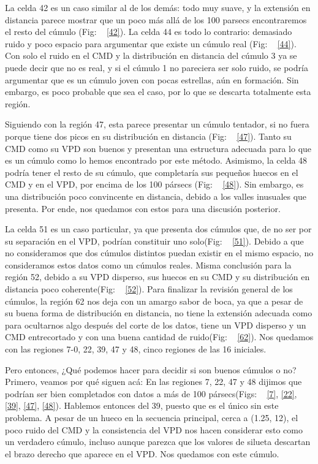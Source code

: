 \documentclass[10pt,twocolumn]{article}
\begin{document}
La celda 42 es un caso similar al de los demás: todo muy suave, y la extensión en distancia parece mostrar que un poco más allá de los 
100 parsecs encontraremos el resto del cúmulo (Fig: ~ \ref{42}). La celda 44 es todo lo contrario: demasiado ruido y poco espacio para argumentar que existe
un cúmulo real (Fig: ~ \ref{44}). Con solo el ruido en el CMD y la distribución en distancia del cúmulo 3 ya se puede decir que no es real, y si el cúmulo 1
no pareciera ser solo ruido, se podría argumentar que es un cúmulo joven con pocas estrellas, aún en formación. Sin embargo, es poco probable
que sea el caso, por lo que se descarta totalmente esta región. 

Siguiendo con la región 47, esta parece presentar un cúmulo tentador, si no fuera porque tiene dos picos en su distribución en distancia (Fig: ~ \ref{47}). 
Tanto su CMD como su VPD son buenos y presentan una estructura adecuada para lo que es un cúmulo como lo hemos encontrado por este método. 
Asimismo, la celda 48 podría tener el resto de su cúmulo, que completaría sus pequeños huecos en el CMD y en el VPD, por encima de los 
100 pársecs (Fig: ~ \ref{48}). Sin embargo, es una distribución poco convincente en distancia, debido a los valles inusuales que presenta. Por ende, 
nos quedamos con estos para una discusión posterior.

La celda 51 es un caso particular, ya que presenta dos cúmulos que, de no ser por su separación en el VPD, podrían constituir uno solo(Fig: ~ \ref{51}). 
Debido a que no consideramos que dos cúmulos distintos puedan existir en el mismo espacio, no consideramos estos datos como un cúmulos reales.
Misma conclusión para la región 52, debido a su VPD disperso, sus huecos en su CMD y su distribución en distancia poco coherente(Fig: ~ \ref{52}). 
Para finalizar la revisión general de los cúmulos, la región 62 nos deja con un amargo sabor de boca, ya que a pesar de su buena forma
de distribución en distancia, no tiene la extensión adecuada como para ocultarnos algo después del corte de los datos, 
tiene un VPD disperso y un CMD entrecortado y con una buena cantidad de ruido(Fig: ~ \ref{62}). Nos quedamos con las regiones 
7-0, 22, 39, 47 y 48, cinco regiones de las 16 iniciales. 

Pero entonces, ¿Qué podemos hacer para decidir si son buenos cúmulos o no? Primero, veamos por qué siguen acá:
En las regiones 7, 22, 47 y 48 dijimos que podrían ser bien completados con datos a más de 100 pársecs(Figs: ~ \ref{7}, 
\ref{22}, \ref{39}, \ref{47}, \ref{48}). 
Hablemos entonces del 39, puesto que es el único sin este problema. A pesar de un hueco en la secuencia principal,
cerca a (1.25, 12), el poco ruido del CMD y la consistencia del VPD nos hacen considerar esto como un verdadero cúmulo,
incluso aunque parezca que los valores de silueta descartan el brazo derecho que aparece en el VPD. 
Nos quedamos con este cúmulo.
\end{document}
